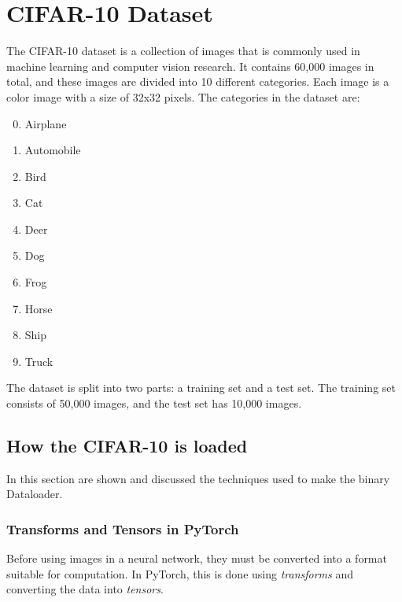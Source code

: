 \section{CIFAR-10 Dataset}
The CIFAR-10 dataset is a collection of images that is commonly used in machine learning and computer vision research. It contains 60,000 images in total, and these images are divided into 10 different categories. Each image is a color image with a size of 32x32 pixels. The categories in the dataset are:

\begin{enumerate}
    \setcounter{enumi}{-1}
    \item Airplane
    \item Automobile
    \item Bird
    \item Cat
    \item Deer
    \item Dog
    \item Frog
    \item Horse
    \item Ship
    \item Truck
\end{enumerate}

The dataset is split into two parts: a training set and a test set. The training set consists of 50,000 images, and the test set has 10,000 images.

\subsection{How the CIFAR-10 is loaded}
In this section are shown and discussed the techniques used to make the binary Dataloader.

\subsubsection{Transforms and Tensors in PyTorch}

Before using images in a neural network, they must be converted into a format suitable for computation. In PyTorch, this is done using \textit{transforms} and converting the data into \textit{tensors}.

